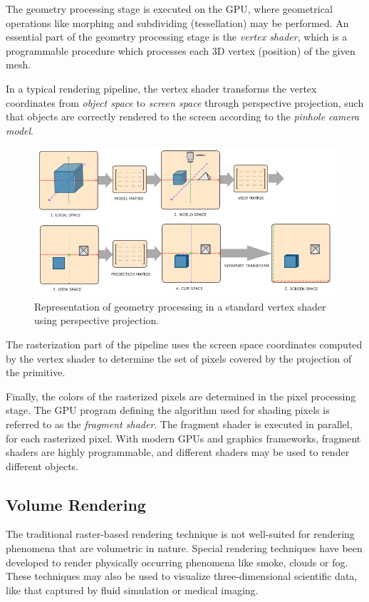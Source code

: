 \documentclass{article}
\begin{document}
The geometry processing stage is executed on the GPU, where geometrical operations like morphing and subdividing (tessellation) may be performed.
An essential part of the geometry processing stage is the \textit{vertex shader}, which is a programmable procedure which processes each 3D vertex (position) of the given mesh.

In a typical rendering pipeline, the vertex shader transforms the vertex coordinates from \textit{object space} to \textit{screen space} through perspective projection, such that
objects are correctly rendered to the screen according to the \textit{pinhole camera model}.

\begin{figure}[tbh]
    \centering
    \includegraphics[width=1.0\textwidth]{images/coordinate_systems.png}
    \caption{Representation of geometry processing in a standard vertex shader using perspective projection\cite{learnopengl_figure}.}
    \label{fig:graphicsTransformations}
\end{figure}

The rasterization part of the pipeline uses the screen space coordinates computed by the vertex shader to
determine the set of pixels covered by the projection of the primitive. 

Finally, the colors of the rasterized pixels are determined in the pixel processing stage.
The GPU program defining the algorithm used for shading pixels is referred to as the \textit{fragment shader}.
The fragment shader is executed in parallel, for each rasterized pixel. With modern GPUs and graphics frameworks, fragment shaders are highly programmable, and different shaders may be used to render different objects.

\newpage

\subsection{Volume Rendering}
The traditional raster-based rendering technique is not well-suited for rendering phenomena that are volumetric in nature.
Special rendering techniques have been developed to render physically occurring phenomena like smoke, clouds or fog. These techniques
may also be used to visualize three-dimensional scientific data, like that captured by fluid simulation or medical imaging.
\end{document}
